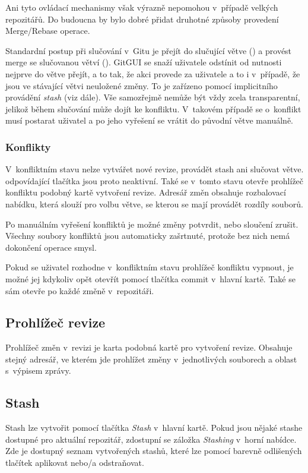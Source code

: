\documentclass[
  biblatex,
  glossaries,
  index
]{kidiplom}
\begin{document}
Ani tyto ovládací mechanismy však výrazně nepomohou v~případě velkých repozitářů. Do budoucna by bylo dobré přidat druhotné způsoby provedení Merge/Rebase operace.

Standardní postup při slučování v~Gitu je přejít do slučující větve () a provést merge se slučovanou větví (). GitGUI se snaží uživatele odstínit od nutnosti nejprve do větve přejít, a to tak, že akci provede za uživatele a to i v~případě, že jsou ve stávající větvi neuložené změny. To je zařízeno pomocí implicitního provádění {\it stash} (viz dále). Vše samozřejmě nemůže být vždy zcela transparentní, jelikož během slučování může dojít ke konfliktu. V~takovém případě se o~konflikt musí postarat uživatel a po jeho vyřešení se vrátit do původní větve manuálně.

\subsubsection{Konflikty}
V~konfliktním stavu nelze vytvářet nové revize, provádět stash ani slučovat větve. odpovídající tlačítka jsou proto neaktivní. Také se v~tomto stavu otevře prohlížeč konfliktu podobný kartě vytvoření revize. Adresář změn obsahuje rozbalovací nabídku, která slouží pro volbu větve, se kterou se mají provádět rozdíly souborů.

Po manuálním vyřešení konfliktů je možné změny potvrdit, nebo sloučení zrušit. Všechny soubory konfliktů jsou automaticky zašrtnuté, protože bez nich nemá dokončení operace smysl.

Pokud se uživatel rozhodne v~konfliktním stavu prohlížeč konfliktu vypnout, je možné jej kdykoliv opět otevřít pomocí tlačítka commit v~hlavní kartě. Také se sám otevře po každé změně v~repozitáři.

\subsection{Prohlížeč revize}
Prohlížeč změn v~revizi je karta podobná kartě pro vytvoření revize. Obsahuje stejný adresář, ve kterém jde prohlížet změny v~jednotlivých souborech a oblast s~výpisem zprávy.

\subsection{Stash}
Stash lze vytvořit pomocí tlačítka {\it Stash} v~hlavní kartě. Pokud jsou nějaké stashe dostupné pro aktuální repozitář, zdostupní se záložka {\it Stashing} v~horní nabídce. Zde je dostupný seznam vytvořených stashů, které lze pomocí barevně odlišených tlačítek aplikovat nebo/a odstraňovat.
\end{document}
